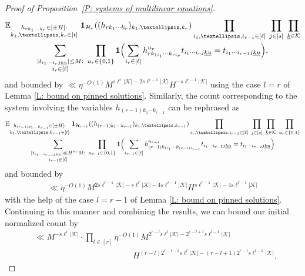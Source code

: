 \documentclass[10pt,a4paper]{amsart}
\newcommand{\Bigbrac}[1]{\Bigl( #1 \Bigr)}
\newcommand{\CH}{{\mathcal H}}
\newcommand{\CK}{{\mathcal K}}
\newcommand{\E}{{\mathbb E}}
\newcommand{\uk}{{\underline{k}}}
\newcommand{\uu}{{\underline{u}}}
\begin{document}
\begin{proof}[Proof of Proposition~\ref{P: systems of multilinear equations}]
    \begin{multline*}
\E_{\substack{h_{rk_1\cdots k_r}\in[\pm H]:\\ k_1,\ldots, k_r\in[t]}}\; \mathbf{1}_{\CH_r}((h_{r k_1 \cdots k_r})_{k_1, \ldots, k_r})  \prod_{i_1,\ldots, i_{r-1}\in[\ell]}\; \prod_{j\in[s]}\; \prod_{\substack{\uk\in\CK}}\\
        \sum_{\substack{|t_{i_1\cdots i_r j\uk\uu}|\leq M:\\ i_r\in[\ell]}}\ 
        \prod_{\substack{u_r\in\{0,1\}}}
         \mathbf{1}\Bigbrac{\sum\limits_{i_r\in[\ell]} h_{rk_{1i_1}\cdots k_{r i_r}}^{u_r}t_{i_1 \cdots i_r j\uk\uu} = t_{i_1 \cdots i_{r-1} j\uk\uu}},
    \end{multline*}
    and bounded by $\ll \eta^{-O(1)}M^{s\ell^{r}|\CK|-2s\ell^{r-1}|\CK|}H^{-s\ell^{r-1}|\CK|}$ using the case $l=r$ of Lemma \ref{L: bound on pinned solutions}. Similarly, the count corresponding to the system involving the variables $h_{(r-1)k_1\cdots k_{r-1}}$ can be rephrased as
    \begin{multline*}
\E_{\substack{h_{(r-1)k_1\cdots k_{r-1}}\in[\pm H]:\\ k_1,\ldots, k_{r-1}\in[t]}}\; \mathbf{1}_{\CH_{r-1}}((h_{(r-1) k_1 \cdots k_{r-1}})_{k_1, \ldots, k_{r-1}})  \prod_{i_1,\ldots, i_{r-2}\in[\ell]}\; \prod_{j\in[s]}\; \prod_{\substack{\uk\in\CK}}\; \prod_{\substack{u_{r}\in\{0,1\}}}\\
        \sum_{\substack{|t_{i_1\cdots i_{r-1} j\uk\uu}|\ll H^{u_r} M:\\ i_{r-1}\in[\ell]}}\ 
        \prod_{\substack{u_{r-1}\in\{0,1\}}}
         \mathbf{1}\Bigbrac{\sum\limits_{i_{r-1}\in[\ell]} h_{(r-1)k_{1i_1}\cdots k_{(r-1) i_{r-1}}}^{u_{r-1}}t_{i_1 \cdots i_{r-1} j\uk\uu} = t_{i_1 \cdots i_{r-2} j\uk\uu}}
    \end{multline*}  
    and bounded by
    \begin{align*}
        \ll \eta^{-O(1)}M^{2s\ell^{r-1}|\CK|-s\ell^{r}|\CK|-4s\ell^{r-1}|\CK|}H^{s\ell^{r-1}|\CK|-4s\ell^{r-1}|\CK|}
    \end{align*}
    with the help of the case $l=r-1$ of Lemma \ref{L: bound on pinned solutions}. Continuing in this manner and combining the results, we can bound our initial normalized count by
    \begin{align*}
        &\ll M^{-s\ell^r|\CK|}\cdot \prod_{l\in[r]} \eta^{-O(1)}  M^{2^{r-l}s\ell^l|\CK|-2^{r-l+1}s\ell^{l-1}|\CK|}\\ 
        &\qquad\qquad\qquad\qquad\qquad\qquad H^{(r-l)2^{r-l-1}s\ell^l|\CK| -(r-l+1)2^{r-l} s\ell^{l-1}|\CK|},

\end{align*}
\end{proof}
\end{document}

